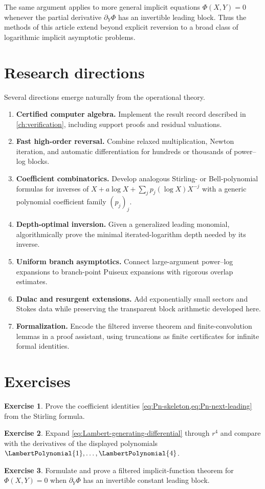 \documentclass[11pt,openany]{book}
\theoremstyle{definition}
\newtheorem{exercise}{Exercise}[chapter]
\theoremstyle{plain}
\theoremstyle{remark}
\begin{document}
The same argument applies to more general implicit equations \(\Phi(X,Y)=0\) whenever the partial derivative \(\partial_Y\Phi\) has an invertible leading block. Thus the methods of this article extend beyond explicit reversion to a broad class of logarithmic implicit asymptotic problems.

\section{Research directions}
Several directions emerge naturally from the operational theory.
\begin{enumerate}
\item \textbf{Certified computer algebra.} Implement the result record described in \cref{ch:verification}, including support proofs and residual valuations.
\item \textbf{Fast high-order reversal.} Combine relaxed multiplication, Newton iteration, and automatic differentiation for hundreds or thousands of power--log blocks.
\item \textbf{Coefficient combinatorics.} Develop analogous Stirling- or Bell-polynomial formulas for inverses of \(X+a\log X+\sum_j p_j(\log X)X^{-j}\) with a generic polynomial coefficient family \((p_j)_j\).
\item \textbf{Depth-optimal inversion.} Given a generalized leading monomial, algorithmically prove the minimal iterated-logarithm depth needed by its inverse.
\item \textbf{Uniform branch asymptotics.} Connect large-argument power--log expansions to branch-point Puiseux expansions with rigorous overlap estimates.
\item \textbf{Dulac and resurgent extensions.} Add exponentially small sectors and Stokes data while preserving the transparent block arithmetic developed here.
\item \textbf{Formalization.} Encode the filtered inverse theorem and finite-convolution lemmas in a proof assistant, using truncations as finite certificates for infinite formal identities.
\end{enumerate}

\section{Exercises}
\begin{exercise}
Prove the coefficient identities \cref{eq:Pn-skeleton,eq:Pn-next-leading} from the Stirling formula.
\end{exercise}
\begin{exercise}
Expand \cref{eq:Lambert-generating-differential} through \(r^4\) and compare with the derivatives of the displayed polynomials \(\LambertPolynomial{1},\ldots,\LambertPolynomial{4}\).
\end{exercise}
\begin{exercise}
Formulate and prove a filtered implicit-function theorem for \(\Phi(X,Y)=0\) when \(\partial_Y\Phi\) has an invertible constant leading block.
\end{exercise}
\end{document}
